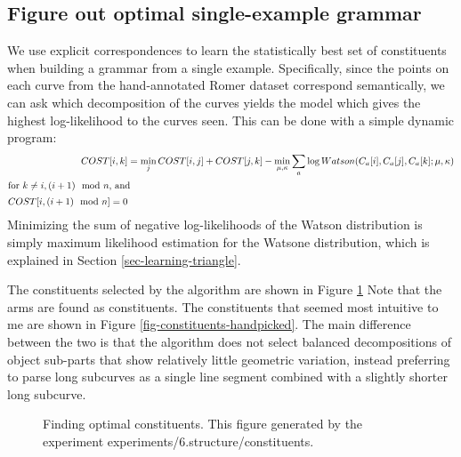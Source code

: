 
\subsection{Figure out optimal single-example grammar}

We use explicit correspondences to learn the statistically best set of
constituents when building a grammar from a single
example. Specifically, since the points on each curve from the
hand-annotated Romer dataset correspond semantically, we can ask which
decomposition of the curves yields the model which gives the highest
log-likelihood to the curves seen. This can be done with a simple
dynamic program:
\begin{align*}
COST[i,k] &= \min_j COST[i,j] + COST[j,k] - \min_{\mu, \kappa} \sum_a \log Watson(C_a[i],C_a[j],C_a[k]; \mu, \kappa)\\
\intertext{for $k\ne i, (i+1) \mod n$, and}
COST[i,(i+1) \mod n] = 0
\end{align*}
Minimizing the sum of negative log-likelihoods of the Watson
distribution is simply maximum likelihood estimation for the Watsone
distribution, which is explained in Section
\ref{sec-learning-triangle}.


The constituents selected by the algorithm are shown in Figure
\ref{fig-constituents-optimal} Note that the arms are found as
constituents. The constituents that seemed most intuitive to me are
shown in Figure \ref{fig-constituents-handpicked}. The main difference
between the two is that the algorithm does not select balanced
decompositions of object sub-parts that show relatively little
geometric variation, instead preferring to parse long subcurves as a
single line segment combined with a slightly shorter long subcurve.

\begin{figure}
\caption[Finding optimal constituents]{Finding optimal constituents. This figure generated by the experiment experiments/6.structure/constituents.}
\label{fig-constituents-optimal}
\end{figure}

